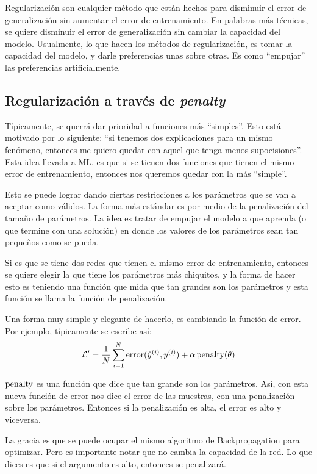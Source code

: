 Regularización son cualquier método que están hechos para disminuir el error de generalización sin aumentar el error de entrenamiento. En palabras más técnicas, se quiere disminuir el error de generalización sin cambiar la capacidad del modelo. Usualmente, lo que hacen los métodos de regularización, es tomar la capacidad del modelo, y darle preferencias unas sobre otras. Es como ``empujar'' las preferencias artificialmente.

\subsection{Regularización a través de \textit{penalty}}
Típicamente, se querrá dar prioridad a funciones más ``simples''. Esto está motivado por lo siguiente: ``si tenemos dos explicaciones para un mismo fenómeno, entonces me quiero quedar con aquel que tenga menos supocisiones''. Esta idea llevada a ML, es que si se tienen dos funciones que tienen el mismo error de entrenamiento, entonces nos queremos quedar con la más ``simple''. 

Esto se puede lograr dando ciertas restricciones a los parámetros que se van a aceptar como válidos. La forma más estándar es por medio de la penalización del tamaño de parámetros. La idea es tratar de empujar el modelo a que aprenda (o que termine con una solución) en donde los valores de los parámetros sean tan pequeños como se pueda.

Si es que se tiene dos redes que tienen el mismo error de entrenamiento, entonces se quiere elegir la que tiene los parámetros más chiquitos, y la forma de hacer esto es teniendo una función que mida que tan grandes son los parámetros y esta función se llama la función de penalización.

Una forma muy simple y elegante de hacerlo, es cambiando la función de error. Por ejemplo, típicamente se escribe así:
\begin{equation*}
    \mathcal{L}' = \frac{1}{N} \sum_{i=1}^N \operatorname{error}(\hat{y}^{(i)}, y^{(i)}) + \alpha  \operatorname{penalty}(\theta)
\end{equation*}

$\operatorname{penalty}$ es una función que dice que tan grande son los parámetros. Así, con esta nueva función de error nos dice el error de las muestras, con una penalización sobre los parámetros. Entonces si la penalización es alta, el error es alto y viceversa.

La gracia es que se puede ocupar el mismo algoritmo de Backpropagation para optimizar. Pero es importante notar que no cambia la capacidad de la red. Lo que dices es que si el argumento es alto, entonces se penalizará.

